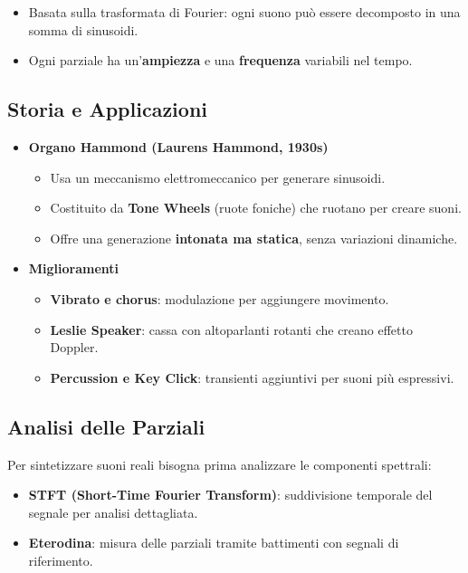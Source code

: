 \begin{itemize}
    \item Basata sulla trasformata di Fourier: ogni suono può essere decomposto in una somma di sinusoidi.
    \item Ogni parziale ha un’\textbf{ampiezza} e una \textbf{frequenza} variabili nel tempo.
\end{itemize}

\subsection*{Storia e Applicazioni}

\begin{itemize}
    \item \textbf{Organo Hammond (Laurens Hammond, 1930s)}
    \begin{itemize}
        \item Usa un meccanismo elettromeccanico per generare sinusoidi.
        \item Costituito da \textbf{Tone Wheels} (ruote foniche) che ruotano per creare suoni.
        \item Offre una generazione \textbf{intonata ma statica}, senza variazioni dinamiche.
    \end{itemize}
    \item \textbf{Miglioramenti}
    \begin{itemize}
        \item \textbf{Vibrato e chorus}: modulazione per aggiungere movimento.
        \item \textbf{Leslie Speaker}: cassa con altoparlanti rotanti che creano effetto Doppler.
        \item \textbf{Percussion e Key Click}: transienti aggiuntivi per suoni più espressivi.
    \end{itemize}
\end{itemize}

\subsection*{Analisi delle Parziali}

Per sintetizzare suoni reali bisogna prima analizzare le componenti spettrali:

\begin{itemize}
    \item \textbf{STFT (Short-Time Fourier Transform)}: suddivisione temporale del segnale per analisi dettagliata.
    \item \textbf{Eterodina}: misura delle parziali tramite battimenti con segnali di riferimento.
\end{itemize}


